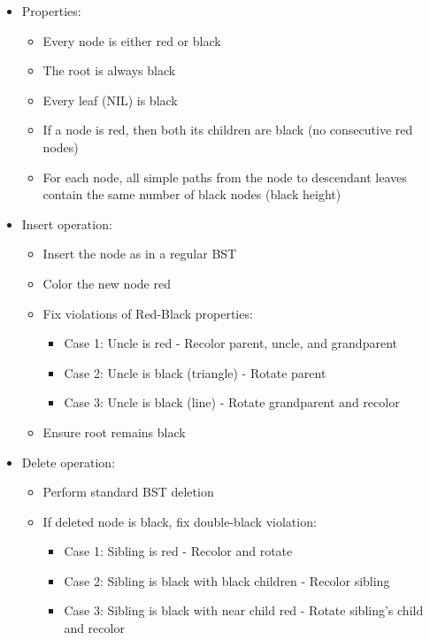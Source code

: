 \begin{itemize}
    \item Properties:
        \begin{itemize}
            \item Every node is either red or black
            \item The root is always black
            \item Every leaf (NIL) is black
            \item If a node is red, then both its children are black (no consecutive red nodes)
            \item For each node, all simple paths from the node to descendant leaves contain the same number of black nodes (black height)
        \end{itemize}
    \item Insert operation:
        \begin{itemize}
            \item Insert the node as in a regular BST
            \item Color the new node red
            \item Fix violations of Red-Black properties:
                \begin{itemize}
                    \item Case 1: Uncle is red - Recolor parent, uncle, and grandparent
                    \item Case 2: Uncle is black (triangle) - Rotate parent
                    \item Case 3: Uncle is black (line) - Rotate grandparent and recolor
                \end{itemize}
            \item Ensure root remains black
        \end{itemize}
    \item Delete operation:
        \begin{itemize}
            \item Perform standard BST deletion
            \item If deleted node is black, fix double-black violation:
                \begin{itemize}
                    \item Case 1: Sibling is red - Recolor and rotate
                    \item Case 2: Sibling is black with black children - Recolor sibling
                    \item Case 3: Sibling is black with near child red - Rotate sibling's child and recolor

\end{itemize}
\end{itemize}
\end{itemize}
